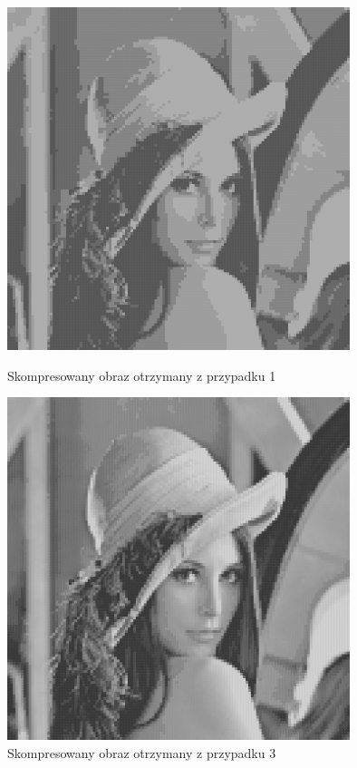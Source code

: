 \documentclass[12pt]{article}
\begin{document}
\begin{figure}[h!]
 \centering
 
 \includegraphics[width=10cm]{CB_neurons=5_block_size=4x4.png}
 \vspace{-0.3cm}
 \caption{Skompresowany obraz otrzymany z przypadku 1}
 \vspace*{\floatsep}

 \includegraphics[width=10cm]{CB_neurons=300_block_size=4x4.png}
 \vspace{-0.3cm}
 \caption{Skompresowany obraz otrzymany z przypadku 3}

\end{figure}
\end{document}
